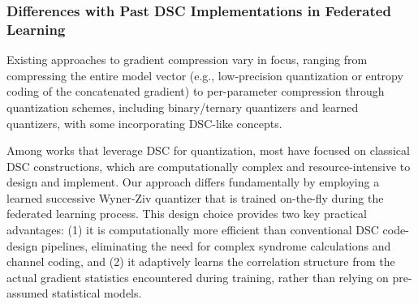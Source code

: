 \subsubsection{Differences with Past DSC Implementations in Federated Learning}
Existing approaches to gradient compression vary in focus, ranging from compressing the entire model vector (e.g., low-precision quantization or entropy coding of the concatenated gradient) to per-parameter compression through quantization schemes, including binary/ternary quantizers and learned quantizers, with some incorporating DSC-like concepts.

Among works that leverage DSC for quantization, most have focused on classical DSC constructions, which are computationally complex and resource-intensive to design and implement. Our approach differs fundamentally by employing a learned successive Wyner-Ziv quantizer that is trained on-the-fly during the federated learning process. This design choice provides two key practical advantages: (1) it is computationally more efficient than conventional DSC code-design pipelines, eliminating the need for complex syndrome calculations and channel coding, and (2) it adaptively learns the correlation structure from the actual gradient statistics encountered during training, rather than relying on pre-assumed statistical models.
